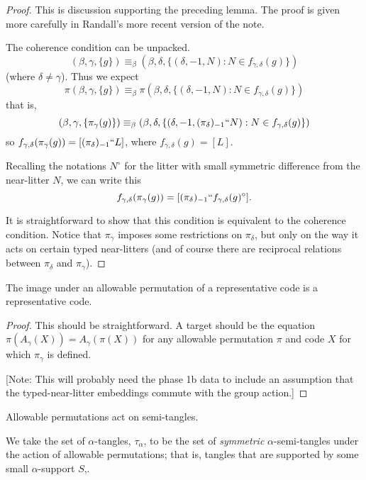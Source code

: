 \begin{proof}
This is discussion supporting the preceding lemma. The proof is given more carefully in Randall’s more recent version of the note.

The coherence condition can be unpacked.
$$(\beta,\gamma,\{g\}) \equiv_\beta (\beta,\delta,\{(\delta,-1,N):N \in f_{\gamma,\delta}(g)\})$$(where $\delta\neq \gamma$).  Thus we expect
$$\pi(\beta,\gamma,\{g\}) \equiv_\beta \pi(\beta,\delta,\{(\delta,-1,N):N \in f_{\gamma,\delta}(g)\})$$
that is,
$$(\beta,\gamma,\{\pi_\gamma(g)\}) \equiv_\beta (\beta,\delta,\{(\delta,-1,(\pi_\delta)_{-1}``N):N \in f_{\gamma,\delta}(g)\})$$
so $f_{\gamma,\delta}(\pi_\gamma(g)) = [(\pi_\delta)_{-1}``L]$, where $f_{\gamma,\delta}(g)=[L]$.

Recalling the notations $N^\circ$ for the litter with small symmetric difference from the near-litter $N$, we can write this $$f_{\gamma,\delta}(\pi_\gamma(g)) = [(\pi_\delta)_{-1}``f_{\gamma,\delta}(g)^\circ].$$

It is straightforward to show that this condition is equivalent to the coherence condition.  Notice that $\pi_\gamma$ imposes some restrictions on $\pi_\delta$, but only on the way it acts on certain typed near-litters (and of course there are reciprocal relations between $\pi_\delta$ and $\pi_\gamma$).
\end{proof}

\begin{lemma}
\label{lem:rep-preserved}
The image under an allowable permutation of a representative code is a representative code.
\end{lemma}

\begin{proof}
This should be straightforward.  A target should be the equation $\pi(A_\gamma(X)) = A_\gamma(\pi(X))$ for any allowable permutation $\pi$ and code $X$ for which $\pi_\gamma$ is defined.

[Note: This will probably need the phase 1b data to include an assumption that the typed-near-litter embeddings commute with the group action.]
\end{proof}

\begin{lemma}
\label{lem:semi-tangle-action}
  Allowable permutations act on semi-tangles.
\end{lemma}

\begin{definition}
\label{def:tangle}
We take the set of $\alpha$-tangles, $\tau_\alpha$, to be the set of \emph{symmetric} $\alpha$-semi-tangles under the action of allowable permutations; that is, tangles that are supported by some small $\alpha$-support $S$,.
\end{definition}

